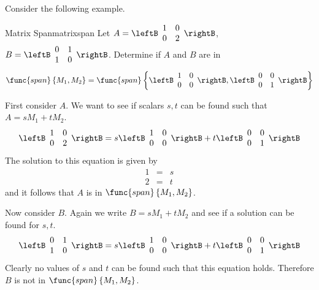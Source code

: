 Consider the following example.

\begin{example}{Matrix Span}{matrixspan}
Let $A = \leftB \begin{array}{rr}
1 & 0 \\
0 & 2 
\end{array}\rightB$, $B = \leftB \begin{array}{rr}
0 & 1 \\
1 & 0 
\end{array}\rightB$. 
Determine if $A$ and $B$ are in 
\[
\func{span}\left\{ M_1, M_2 \right\} = \func{span} \left\{ \leftB \begin{array}{rr}
1 & 0 \\
0 & 0 
\end{array}\rightB, \leftB \begin{array}{rr}
0 & 0 \\
0 & 1 
\end{array}\rightB \right\}\] 
\end{example}

\begin{solution}

First consider $A$. We want to see if scalars $s,t$ can be found such that $A = s M_1 + t M_2$. 
\begin{equation*}
\leftB \begin{array}{rr}
1 & 0 \\
0 & 2 
\end{array}\rightB = 
s \leftB \begin{array}{rr}
1 & 0 \\
0 & 0 
\end{array}\rightB + t \leftB \begin{array}{rr}
0 & 0 \\
0 & 1 
\end{array}\rightB
\end{equation*}
The solution to this equation is given by 
\begin{eqnarray*}
1 &=& s \\
2 &=& t
\end{eqnarray*}
and it follows that $A$ is in $\func{span} \left\{ M_1, M_2 \right\}$. 

Now consider $B$. Again we write $B = sM_1 + t M_2$ and see if a solution can be found for $s, t$. 
\begin{equation*}
\leftB \begin{array}{rr}
0 & 1 \\
1 & 0 
\end{array}\rightB = 
s \leftB \begin{array}{rr}
1 & 0 \\
0 & 0 
\end{array}\rightB + t \leftB \begin{array}{rr}
0 & 0 \\
0 & 1 
\end{array}\rightB
\end{equation*}
Clearly no values of $s$ and $t$ can be found such that this equation holds. Therefore $B$ is not in $\func{span} \left\{ M_1, M_2 \right\}$.
\end{solution}

